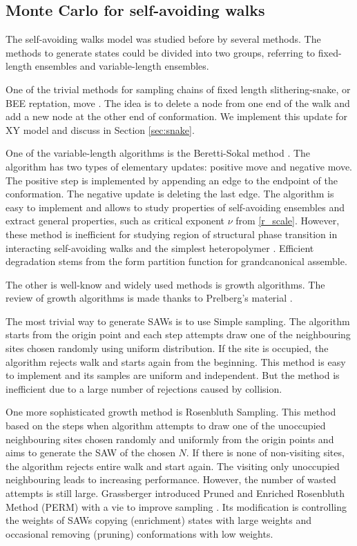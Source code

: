 \subsection{Monte Carlo for self-avoiding walks}
 The self-avoiding walks model was studied before by several methods. The methods to generate states could be divided into two groups, referring to fixed-length ensembles and variable-length ensembles. 
 
One of the trivial methods for sampling chains of fixed length slithering-snake, or BEE reptation, move \cite{Caracciolo2011}.  The idea is to delete a node from one end of the walk and add a new node at the other end of conformation. We implement this update for XY model and discuss in Section \ref{sec:snake}. 

One of the variable-length algorithms is the Beretti-Sokal method \cite{Berretti1985}. The algorithm has two types of elementary updates: positive move and negative move. The positive step is implemented by appending an edge to the endpoint of the conformation. The negative update is deleting the last edge. The algorithm is easy to implement and allows to study properties of self-avoiding ensembles and extract general properties,  such as critical exponent $\nu$ from \eqref{r_scale}. However, these method is inefficient for studying region of structural phase transition in  interacting self-avoiding walks \cite{Nidras_1996} and the simplest heteropolymer \cite{Faizullina2021}. Efficient degradation stems from the form partition function for grandcanonical assemble.  

The other is well-know and widely used methods is growth algorithms. The review of growth algorithms is made thanks to Prelberg's material \cite{prelberg}. 

 The most trivial way to generate SAWs is to use Simple sampling. The algorithm starts from the origin point and each step attempts draw one of the neighbouring sites chosen randomly using uniform distribution. If the site is occupied, the algorithm rejects walk and starts again from the beginning. This method is easy to implement and its samples are uniform and independent. But the method is inefficient due to a large number of rejections caused by collision.

One  more sophisticated growth method is Rosenbluth Sampling. This method based on the steps when algorithm attempts to draw one of the unoccupied neighbouring sites chosen randomly and uniformly from the origin points and aims to generate the SAW of the chosen $N$. If there is none of non-visiting sites, the algorithm rejects entire walk and start again. The visiting only  unoccupied neighbouring leads to increasing performance. However, the number of wasted attempts is still large. Grassberger introduced Pruned and Enriched Rosenbluth Method (PERM) with a vie to improve sampling \cite{PhysRevE.56.3682}. Its modification is controlling the weights of SAWs copying (enrichment) states with large weights and occasional removing (pruning) conformations with low weights. 

